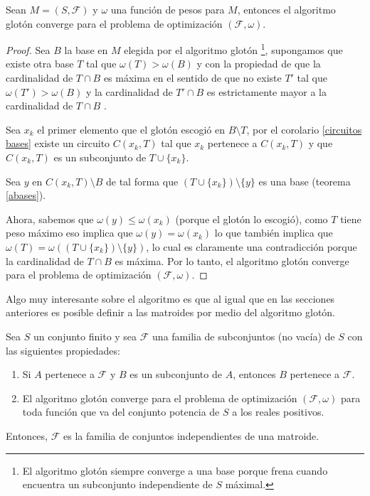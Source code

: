 \begin{teo}
Sean $M=(S,\mathcal{F})$ y $\omega$ una función de pesos para $M$, entonces el algoritmo glotón converge para el problema de optimización $(\mathcal{F}, \omega)$. 
\end{teo}
\begin{proof}
Sea $B$ la base en $M$ elegida por el algoritmo glotón \footnote{El algoritmo glotón siempre converge a una base porque frena cuando encuentra un subconjunto independiente de $S$ máximal.}, supongamos que existe otra base $T$ tal que $\omega(T)> \omega(B)$ y con la propiedad de que la cardinalidad de $T\cap B$ es máxima en el sentido de que no existe $T'$ tal que $\omega(T')> \omega(B)$ y la cardinalidad de $T'\cap B$ es estrictamente mayor a la cardinalidad de $T\cap B$ . 

Sea $x_k$ el primer elemento que el glotón escogió en $B \setminus T$, por el corolario \ref{circuitos bases} existe un circuito $C(x_k,T)$ tal que $x_k$ pertenece a $C(x_k,T)$ y que $C(x_k,T)$ es un subconjunto de $T \cup \{x_k\}$. 

Sea $y$ en $C(x_k,T) \setminus B$ de tal forma que $(T \cup \{x_k\}) \setminus \{y\}$ es una base (teorema \ref{abases}). 
 
Ahora, sabemos que $\omega(y)\leq \omega(x_k)$ (porque el glotón lo escogió), como $T$ tiene peso máximo eso implica que $\omega(y)=\omega(x_k)$ lo que también implica que $\omega(T)=\omega((T \cup \{x_k\}) \setminus \{y\})$, lo cual es claramente una contradicción porque la cardinalidad de $T\cap B$ es máxima. Por lo tanto, el algoritmo glotón converge para el problema de optimización $(\mathcal{F}, \omega)$.
\end{proof}

Algo muy interesante sobre el algoritmo es que al igual que en las secciones anteriores es posible definir a las matroides por medio del algoritmo glotón. 

\begin{teo} \label{axiomas gloton}
Sea $S$ un conjunto finito y sea $\mathcal{F}$ una familia de subconjuntos (no vacía) de $S$ con las siguientes propiedades:
\begin{enumerate}
\item Si $A$ pertenece a $\mathcal{F}$ y $B$ es un subconjunto de $A$, entonces $B$ pertenece a $\mathcal{F}$.
\item El algoritmo glotón converge para el problema de optimización $(\mathcal{F},\omega)$ para toda función que va del conjunto potencia de $S$ a los reales positivos.
\end{enumerate}
Entonces, $\mathcal{F}$ es la familia de conjuntos independientes de una matroide. 
\end{teo}

